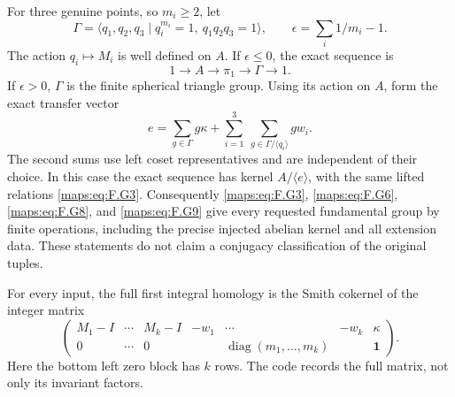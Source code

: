 \begin{theorem}
For three genuine points, so $m_i\ge2$, let
\[
 \Gamma=\langle q_1,q_2,q_3\mid q_i^{m_i}=1,
                         \ q_1q_2q_3=1\rangle,
 \qquad \epsilon=\sum_i1/m_i-1.                           \tag{F.G7}\label{maps:eq:F.G7}
\]
The action $q_i\mapsto M_i$ is well defined on $A$.
If $\epsilon\le0$, the exact sequence is
\[
                    1\longrightarrow A\longrightarrow\pi_1
                         \longrightarrow\Gamma\longrightarrow1. 
 \tag{F.G8}\label{maps:eq:F.G8}
\]
If $\epsilon>0$, $\Gamma$ is the finite spherical triangle group.
Using its action on $A$, form the exact transfer vector
\[
 e=\sum_{g\in\Gamma}g\kappa+
       \sum_{i=1}^3\ \sum_{g\in\Gamma/\langle q_i\rangle}g w_i.
 \tag{F.G9}\label{maps:eq:F.G9}
\]
The second sums use left coset representatives and are independent
of their choice.  In this case the exact sequence has kernel
$A/\langle e\rangle$, with the same lifted relations \eqref{maps:eq:F.G3}.
Consequently \eqref{maps:eq:F.G3}, \eqref{maps:eq:F.G6}, \eqref{maps:eq:F.G8}, and \eqref{maps:eq:F.G9} give every requested
fundamental group by finite operations, including the precise
injected abelian kernel and all extension data.  These statements
do not claim a conjugacy classification of the original tuples.

For every input, the full first integral homology is the Smith
cokernel of the integer matrix
\[
 \begin{pmatrix}
 M_1-I&\cdots&M_k-I&-w_1&\cdots&-w_k&\kappa\\
 0&\cdots&0&&\operatorname{diag}(m_1,\ldots,m_k)&&\boldsymbol1
 \end{pmatrix}.                                           \tag{F.G10}\label{maps:eq:F.G10}
\]
Here the bottom left zero block has $k$ rows.  The code records
the full matrix, not only its invariant factors.

\end{theorem}


